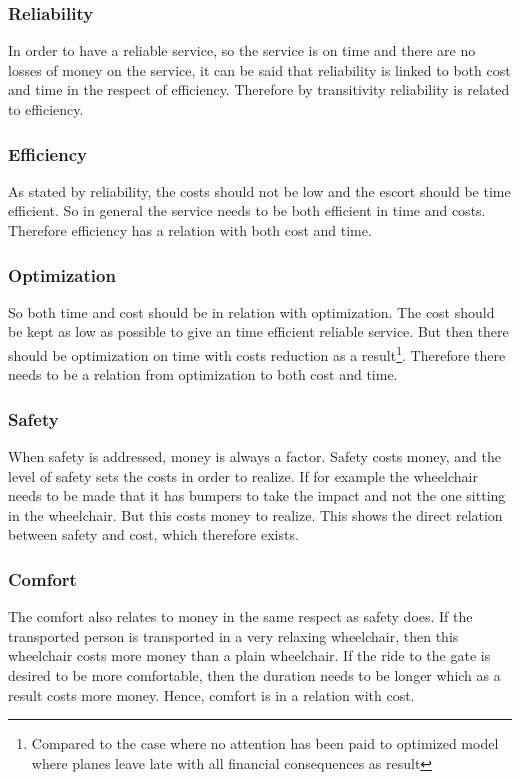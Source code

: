 \documentclass[a4paper, 12pt, notitlepage]{report}
\begin{document}
\subsubsection{Reliability}
In order to have a reliable service, so the service is on time and there are no losses of money on the service, it can be said that reliability is linked to both cost and time in the respect of efficiency. Therefore by transitivity reliability is related to efficiency.
\subsubsection{Efficiency}
As stated by reliability, the costs should not be low and the escort should be time efficient. So in general the service needs to be both efficient in time and costs. Therefore efficiency has a relation with both cost and time.
\subsubsection{Optimization}
So both time and cost should be in relation with optimization. The cost should be kept as low as possible to give an time efficient reliable service. But then there should be optimization on time with costs reduction as a result\footnote{Compared to the case where no attention has been paid to optimized model where planes leave late with all financial consequences as result}. Therefore there needs to be a relation from optimization to both cost and time.
\subsubsection{Safety}
When safety is addressed, money is always a factor. Safety costs money, and the level of safety sets the costs in order to realize. If for example the wheelchair needs to be made that it has bumpers to take the impact and not the one sitting in the wheelchair. But this costs money to realize. This shows the direct relation between safety and cost, which therefore exists.
\subsubsection{Comfort}
The comfort also relates to money in the same respect as safety does. If the transported person is transported in a very relaxing wheelchair, then this wheelchair costs more money than a plain wheelchair. If the ride to the gate is desired to be more comfortable, then the duration needs to be longer which as a result costs more money. Hence, comfort is in a relation with cost.
\end{document}
